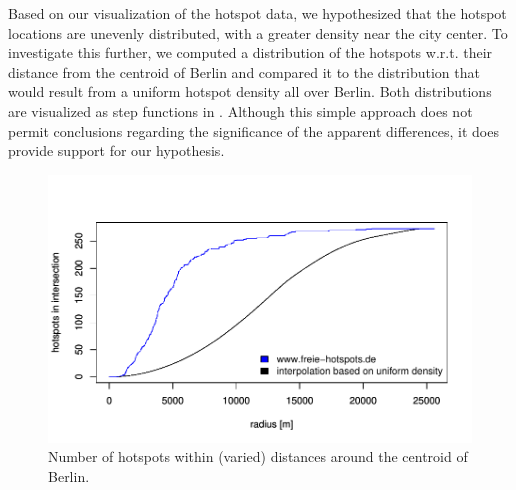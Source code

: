 Based on our visualization of the hotspot data, we hypothesized that the hotspot locations
are unevenly distributed, with a greater density near the city center.
To investigate this further, we computed a distribution of the hotspots w.r.t. their
distance from the centroid of Berlin and compared it to the distribution that would
result from a uniform hotspot density all over Berlin. Both distributions are visualized
as step functions in . Although this simple approach does
not permit conclusions regarding the significance of the apparent differences,
it does provide support for our hypothesis.

\begin{figure}[tbp]
	\centering
	\includegraphics[scale=0.6]{imgs/wifi_distributions.pdf}
	\caption{Number of hotspots within (varied) distances around the centroid of Berlin.}
	\label{fig:wifi_distributions}
\end{figure}

